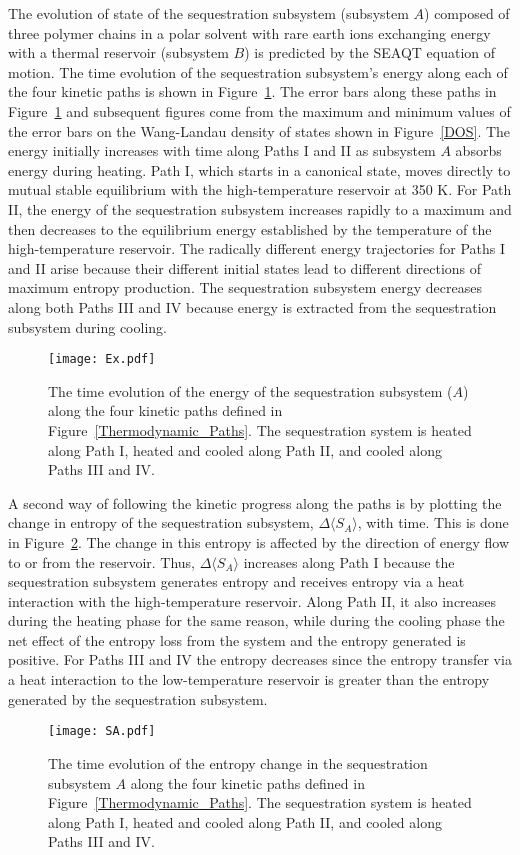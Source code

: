 \documentclass[
journal=jcisd8, %
manuscript=article,
layout=twocolumn   %
]{achemso}
\begin{document}
The evolution of state of the sequestration subsystem (subsystem $A$) composed of three polymer chains in a polar solvent with rare earth ions exchanging energy with a thermal reservoir (subsystem $B$) is predicted by the SEAQT equation of motion. The time evolution of the sequestration subsystem's energy along each of the four kinetic paths is shown in Figure~\ref{EP_1}.  The error bars along these paths in Figure~\ref{EP_1} and subsequent figures come from the maximum and minimum values of the error bars on the Wang-Landau density of states shown in Figure~\ref{DOS}.  The energy initially increases with time along Paths I and II as subsystem $A$ absorbs energy during heating. Path I, which starts in a canonical state, moves directly to mutual stable equilibrium with the high-temperature reservoir at 350 K. For Path II, the energy of the sequestration subsystem increases rapidly to a maximum and then decreases to the equilibrium energy established by the temperature of the high-temperature reservoir. The radically different energy trajectories for Paths I and II arise because their different initial states lead to different directions of maximum entropy production. The sequestration subsystem energy decreases along both Paths III and IV because energy is extracted from the sequestration subsystem during cooling.
\begin{figure}
	\centering
	\texttt{[image: Ex.pdf]}
	\caption{ The time evolution of the energy of the sequestration subsystem ($A$) along the four kinetic paths defined in Figure~\ref{Thermodynamic_Paths}. The sequestration system is heated along Path I, heated and cooled along Path II, and cooled along Paths III and IV.}
	\label{EP_1}
\end{figure}

A second way of following the kinetic progress along the paths is by plotting the change in entropy of the sequestration subsystem, $\Delta \langle S_{A} \rangle$, with time. This is done in Figure~\ref{QP_1}. The change in this entropy is affected by the direction of energy flow to or from the reservoir.  Thus, $\Delta \langle S_{A} \rangle$ increases along Path I because the sequestration subsystem generates entropy and receives entropy via a heat interaction with the high-temperature reservoir. Along Path II, it also increases during the heating phase for the same reason, while during the cooling phase the net effect of the entropy loss from the system and the entropy generated is positive. For Paths III and IV the entropy decreases since the entropy transfer via a heat interaction to the low-temperature reservoir is greater than the entropy generated by the sequestration subsystem.
\begin{figure}
	\centering
	\texttt{[image: SA.pdf]}
	\caption{The time evolution of the entropy change in the sequestration subsystem $A$ along the four kinetic paths defined in Figure~\ref{Thermodynamic_Paths}. The sequestration system is heated along Path I, heated and cooled along Path II, and cooled along Paths III and IV.}
	\label{QP_1}
\end{figure}
\end{document}
